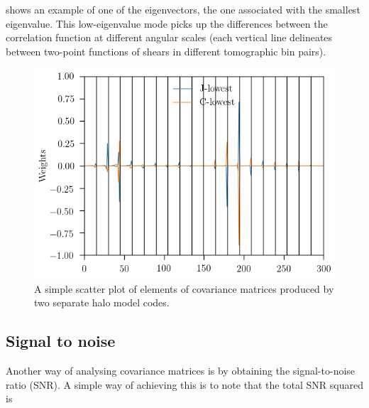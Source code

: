 \documentclass[twocolumn]{\docclass}
\begin{document}
 shows an example of one of the eigenvectors, the one associated with the smallest eigenvalue. This low-eigenvalue mode picks up the differences between the correlation function at different angular scales (each vertical line delineates between two-point functions of shears in different tomographic bin pairs).

\begin{figure}
\includegraphics[width=0.9\columnwidth]{evector.png}
\caption{A simple scatter plot of elements of covariance matrices produced by two separate halo model codes. \label{fig:evector}}
\end{figure}

\subsection{Signal to noise}

Another way of analysing covariance matrices is by obtaining the signal-to-noise ratio (SNR). A simple way of achieving this is to note that the total SNR squared is
\end{document}
